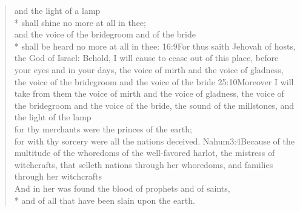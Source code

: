 \begin{verse}
and the light of a lamp\\*\vin
shall shine no more at all in thee;\\
and the voice of the bridegroom and of the bride\\*\vin
shall be heard no more at all in thee:%
					{16:9}{For thus saith Jehovah of hosts, the God of Israel: Behold, I will cause to cease out of this place, before your eyes and in your days, the voice of mirth and the voice of gladness, the voice of the bridegroom and the voice of the bride}%
					{25:10}{Moreover I will take from them the voice of mirth and the voice of gladness, the voice of the bridegroom and the voice of the bride, the sound of the millstones, and the light of the lamp}\\
 for thy merchants were the princes of the earth;%
	\\
 for with thy sorcery were all the nations deceived.%
				{Nahum}{3:4}{Because of the multitude of the whoredoms of the well-favored harlot, the mistress of witchcrafts, that selleth nations through her whoredoms, and families through her witchcrafts}\\
And in her was found the blood of prophets and of saints,\\*\vin
and of all that have been slain upon the earth.%
\end{verse}
